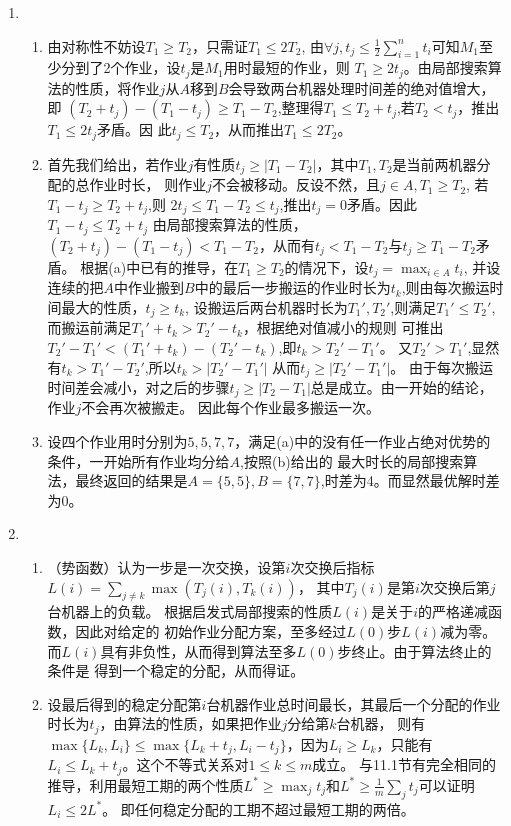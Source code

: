\documentclass[a4paper]{article}
\begin{document}
\begin{enumerate}[label=\arabic*.]
    \item \begin{enumerate}[label=(\alph*)]
    \item 由对称性不妨设$T_1\geq T_2$，只需证$T_1 \leq 2T_2$,
    由$\forall j,t_j\leq \frac{1}{2}\sum_{i=1}^n t_i$可知$M_1$至少分到了2个作业，设$t_j$是$M_1$用时最短的作业，则
    $T_1\geq 2t_j$。由局部搜索算法的性质，将作业$j$从$A$移到$B$会导致两台机器处理时间差的绝对值增大，即
    $(T_2+t_j)-(T_1-t_j)\geq T_1-T_2$,整理得$T_1\leq T_2+t_j$,若$T_2<t_j$，推出$T_1\leq 2t_j$矛盾。因
    此$t_j\leq T_2$，从而推出$T_1\leq 2T_2$。
    \item 首先我们给出，若作业$j$有性质$t_j\geq |T_1-T_2|$，其中$T_1,T_2$是当前两机器分配的总作业时长，
    则作业$j$不会被移动。反设不然，且$j\in A,T_1\geq T_2$,
    若$T_1-t_j\geq T_2+t_j$,则 $2t_j\leq T_1-T_2\leq t_j$,推出$t_j=0$矛盾。因此$T_1-t_j\leq T_2+t_j$
    由局部搜索算法的性质，$(T_2+t_j)-(T_1-t_j)<T_1-T_2$，从而有$t_j<T_1-T_2$与$t_j\geq T_1-T_2$矛盾。
    根据(a)中已有的推导，在$T_1\geq T_2$的情况下，设$t_j=\max_{i\in A}t_i$,
    并设连续的把$A$中作业搬到$B$中的最后一步搬运的作业时长为$t_k$,则由每次搬运时间最大的性质，$t_j\geq t_k$,
    设搬运后两台机器时长为$T_1',T_2'$,则满足$T_1'\leq T_2'$,而搬运前满足$T_1'+t_k >T_2'-t_k$，根据绝对值减小的规则
    可推出$T_2'-T_1'< (T_1'+t_k)-(T_2'-t_k)$,即$t_k > T_2'-T_1'$。
    又$T_2'>T_1'$,显然有$t_k>T_1'-T_2'$,所以$t_k>|T_2'-T_1'|$
    从而$t_j\geq |T_2'-T_1'|$。
    由于每次搬运时间差会减小，对之后的步骤$t_j\geq |T_2-T_1|$总是成立。由一开始的结论，作业$j$不会再次被搬走。
    因此每个作业最多搬运一次。
    \item 设四个作业用时分别为$5,5,7,7$，满足(a)中的没有任一作业占绝对优势的条件，一开始所有作业均分给$A$,按照(b)给出的
    最大时长的局部搜索算法，最终返回的结果是$A=\{5,5\},B=\{7,7\}$,时差为4。而显然最优解时差为0。
    \end{enumerate}
  \item 
    \begin{enumerate}[label=(\alph*)]
    \item （势函数）认为一步是一次交换，设第$i$次交换后指标$L(i)=\sum_{j\neq k} \max(T_j(i),T_k(i))$，
    其中$T_j(i)$是第$i$次交换后第$j$台机器上的负载。
    根据启发式局部搜索的性质$L(i)$是关于$i$的严格递减函数，因此对给定的
    初始作业分配方案，至多经过$L(0)$步$L(i)$减为零。而$L(i)$具有非负性，从而得到算法至多$L(0)$步终止。由于算法终止的条件是
    得到一个稳定的分配，从而得证。
    \item 设最后得到的稳定分配第$i$台机器作业总时间最长，其最后一个分配的作业时长为$t_j$，由算法的性质，如果把作业$j$分给第$k$台机器，
    则有$\max\{L_k,L_i\}\leq \max\{L_k+t_j,L_i-t_j\}$，因为$L_i\geq L_k$，只能有$L_i\leq L_k+t_j$。这个不等式关系对$1\leq k\leq m$成立。
    与11.1节有完全相同的推导，利用最短工期的两个性质$L^*\geq \max_j t_j$和$L^*\geq \frac{1}{m}\sum_j t_j$可以证明$L_i\leq 2L^*$。
    即任何稳定分配的工期不超过最短工期的两倍。
    \end{enumerate}
    
  \end{enumerate}
\end{document}
